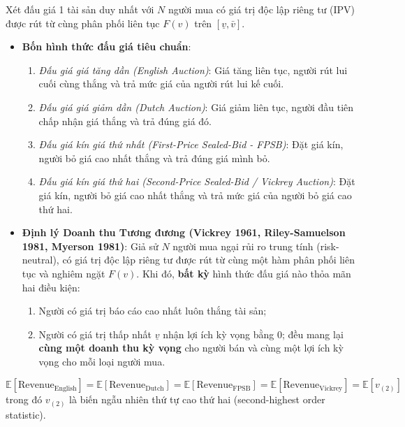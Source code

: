 \documentclass[
]{article}
\providecommand{\tightlist}{%
  \setlength{\itemsep}{0pt}\setlength{\parskip}{0pt}}
\begin{document}
Xét đấu giá 1 tài sản duy nhất với \(N\) người mua có giá trị độc lập
riêng tư (IPV) được rút từ cùng phân phối liên tục \(F(v)\) trên
\([\underline{v}, \bar{v}]\).

\begin{itemize}
\tightlist
\item
  \textbf{Bốn hình thức đấu giá tiêu chuẩn}:

  \begin{enumerate}
  \def\labelenumi{\arabic{enumi}.}
  \tightlist
  \item
    \emph{Đấu giá giá tăng dần (English Auction)}: Giá tăng liên tục,
    người rút lui cuối cùng thắng và trả mức giá của người rút lui kế
    cuối.
  \item
    \emph{Đấu giá giá giảm dần (Dutch Auction)}: Giá giảm liên tục,
    người đầu tiên chấp nhận giá thắng và trả đúng giá đó.
  \item
    \emph{Đấu giá kín giá thứ nhất (First-Price Sealed-Bid - FPSB)}: Đặt
    giá kín, người bỏ giá cao nhất thắng và trả đúng giá mình bỏ.
  \item
    \emph{Đấu giá kín giá thứ hai (Second-Price Sealed-Bid / Vickrey
    Auction)}: Đặt giá kín, người bỏ giá cao nhất thắng và trả mức giá
    của người bỏ giá cao thứ hai.
  \end{enumerate}
\item
  \textbf{Định lý Doanh thu Tương đương (Vickrey 1961, Riley-Samuelson
  1981, Myerson 1981)}: Giả sử \(N\) người mua ngại rủi ro trung tính
  (risk-neutral), có giá trị độc lập riêng tư được rút từ cùng một hàm
  phân phối liên tục và nghiêm ngặt \(F(v)\). Khi đó, \textbf{bất kỳ}
  hình thức đấu giá nào thỏa mãn hai điều kiện:

  \begin{enumerate}
  \def\labelenumi{\arabic{enumi}.}
  \tightlist
  \item
    Người có giá trị báo cáo cao nhất luôn thắng tài sản;
  \item
    Người có giá trị thấp nhất \(\underline{v}\) nhận lợi ích kỳ vọng
    bằng 0; đều mang lại \textbf{cùng một doanh thu kỳ vọng} cho người
    bán và cùng một lợi ích kỳ vọng cho mỗi loại người mua.
  \end{enumerate}
\end{itemize}

\[\mathbb{E}[\text{Revenue}_{\text{English}}] = \mathbb{E}[\text{Revenue}_{\text{Dutch}}] = \mathbb{E}[\text{Revenue}_{\text{FPSB}}] = \mathbb{E}[\text{Revenue}_{\text{Vickrey}}] = \mathbb{E}\left[ v_{(2)} \right]\]
trong đó \(v_{(2)}\) là biến ngẫu nhiên thứ tự cao thứ hai
(second-highest order statistic).
\end{document}

